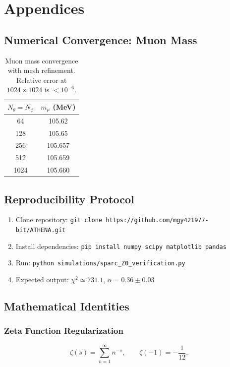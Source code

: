 \documentclass[12pt,oneside]{book}
\begin{document}
\chapter{Appendices}

\section{Numerical Convergence: Muon Mass}

\begin{table}[H]
\centering
\begin{tabular}{|c|c|}
\hline
$N_\theta = N_\phi$ & $m_\mu$ (MeV) \\
\hline
64 & 105.62 \\
128 & 105.65 \\
256 & 105.657 \\
512 & 105.659 \\
1024 & 105.660 \\
\hline
\end{tabular}
\caption{Muon mass convergence with mesh refinement. Relative error at $1024 \times 1024$ is $< 10^{-6}$.}
\end{table}

\section{Reproducibility Protocol}

\begin{enumerate}
    \item Clone repository: \texttt{git clone https://github.com/mgy421977-bit/ATHENA.git}
    \item Install dependencies: \texttt{pip install numpy scipy matplotlib pandas}
    \item Run: \texttt{python simulations/sparc\_Z0\_verification.py}
    \item Expected output: $\chi^2 \simeq 731.1$, $\alpha = 0.36 \pm 0.03$
\end{enumerate}

\section{Mathematical Identities}

\subsection{Zeta Function Regularization}
\[
\zeta(s) = \sum_{n=1}^\infty n^{-s}, \qquad \zeta(-1) = -\frac{1}{12}.
\]
\end{document}
